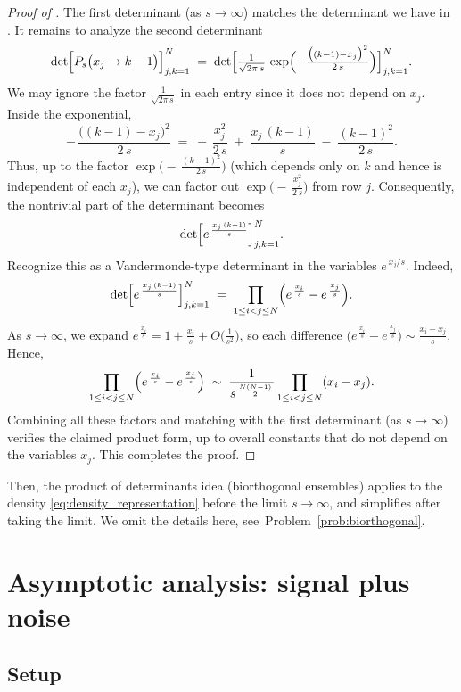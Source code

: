 \documentclass[letterpaper,11pt,oneside,reqno]{article}
\numberwithin{equation}{section}
\theoremstyle{definition}
\begin{document}
\begin{proof}[Proof of ]
The first determinant (as $s\to\infty$) matches the determinant
we have in .
It remains to analyze the second determinant
\[
   \det\Bigl[
      P_s\bigl(x_j \to k-1\bigr)
   \Bigr]_{j,k=1}^N
   \;=\;
   \det\Bigl[
      \tfrac{1}{\sqrt{2\pi\,s}}\,
      \exp\Bigl(-\tfrac{\bigl((k-1) - x_j\bigr)^2}{2\,s}\Bigr)
   \Bigr]_{j,k=1}^N.
\]
We may ignore the factor \(\tfrac{1}{\sqrt{2\pi\,s}}\) in each entry since it does not depend on \(x_j\).  Inside the exponential,
\[
   -\,\frac{\bigl((k-1) - x_j\bigr)^2}{2\,s}
   \;=\;
   -\,\frac{x_j^2}{2\,s}
   \;+\;\frac{x_j\,(k-1)}{s}
   \;-\;\frac{(k-1)^2}{2\,s}.
\]
Thus, up to the factor
\(\exp\bigl(-\,\tfrac{(k-1)^2}{2\,s}\bigr)\)
(which depends only on \(k\) and hence is independent of each \(x_j\)),
we can factor out
\(\exp\bigl(-\,\tfrac{x_j^2}{2\,s}\bigr)\)
from row \(j\).  Consequently, the nontrivial part of the determinant becomes
\[
   \det\Bigl[
      e^{\,\frac{x_j\,(k-1)}{s}}
   \Bigr]_{j,k=1}^N.
\]
Recognize this as a Vandermonde-type determinant in the variables \(e^{\,x_j/s}\).  Indeed,
\[
   \det\Bigl[
      e^{\,\frac{x_j\,(k-1)}{s}}
   \Bigr]_{j,k=1}^N
   \;=\;
   \prod_{1 \le i<j \le N}
   \Bigl(e^{\,\frac{x_i}{s}} - e^{\,\frac{x_j}{s}}\Bigr).
\]
As \(s \to \infty\), we expand
\(e^{\,\frac{x_i}{s}} = 1 + \frac{x_i}{s} + O\bigl(\tfrac{1}{s^2}\bigr)\),
so each difference
\(\bigl(e^{\,\frac{x_i}{s}} - e^{\,\frac{x_j}{s}}\bigr)
 \sim \tfrac{x_i - x_j}{s}\).
Hence,
\[
   \prod_{1 \le i<j \le N}
   \Bigl(e^{\,\frac{x_i}{s}} - e^{\,\frac{x_j}{s}}\Bigr)
   \;\sim\;
   \frac{1}{s^{\,\frac{N(N-1)}{2}}}
   \prod_{1 \le i<j \le N} (x_i - x_j).
\]
Combining all these factors and matching with the first determinant (as $s\to\infty$) verifies the claimed product form, up to overall constants that do not depend on the variables \(x_j\).  This completes the proof.
\end{proof}

Then, the product of determinants idea
(biorthogonal ensembles)
applies
to the density \eqref{eq:density_representation}
before the limit $s\to\infty$,
and simplifies after taking the limit.
We omit the details here,
see~Problem~\ref{prob:biorthogonal}.


\section{Asymptotic analysis: signal plus noise}

\subsection{Setup}
\end{document}
